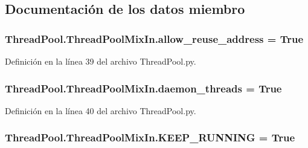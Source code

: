 \subsection{Documentación de los datos miembro}
\hypertarget{class_thread_pool_1_1_thread_pool_mix_in_a6be85971f1b071cd2f7d958ff988310f}{
\subsubsection[{allow\-\_\-reuse\-\_\-address}]{\setlength{\rightskip}{0pt plus 5cm}Thread\-Pool.\-Thread\-Pool\-Mix\-In.\-allow\-\_\-reuse\-\_\-address = True\hspace{0.3cm}{\ttfamily [static]}}}\label{class_thread_pool_1_1_thread_pool_mix_in_a6be85971f1b071cd2f7d958ff988310f}


Definición en la línea 39 del archivo Thread\-Pool.\-py.

\hypertarget{class_thread_pool_1_1_thread_pool_mix_in_ac5a128ba2a86dc5cd90fd526a26ad148}{
\subsubsection[{daemon\-\_\-threads}]{\setlength{\rightskip}{0pt plus 5cm}Thread\-Pool.\-Thread\-Pool\-Mix\-In.\-daemon\-\_\-threads = True\hspace{0.3cm}{\ttfamily [static]}}}\label{class_thread_pool_1_1_thread_pool_mix_in_ac5a128ba2a86dc5cd90fd526a26ad148}


Definición en la línea 40 del archivo Thread\-Pool.\-py.

\hypertarget{class_thread_pool_1_1_thread_pool_mix_in_a7e3bc178cfa9c8583685c62e1104a370}{
\subsubsection[{K\-E\-E\-P\-\_\-\-R\-U\-N\-N\-I\-N\-G}]{\setlength{\rightskip}{0pt plus 5cm}Thread\-Pool.\-Thread\-Pool\-Mix\-In.\-K\-E\-E\-P\-\_\-\-R\-U\-N\-N\-I\-N\-G = True\hspace{0.3cm}{\ttfamily [static]}}}\label{class_thread_pool_1_1_thread_pool_mix_in_a7e3bc178cfa9c8583685c62e1104a370}



